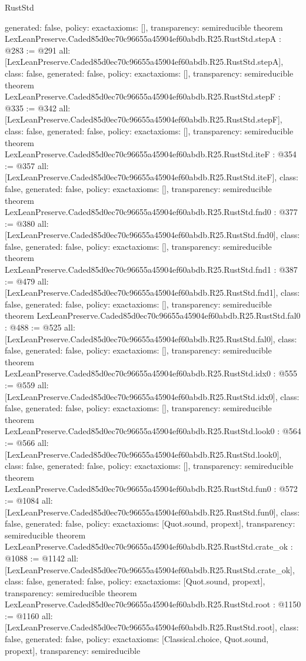 \begin{lexlean}{RustStd}
\begin{coremodule}
{  generated: false,
  policy: exact{axioms: []},
  transparency: semireducible
}
theorem LexLeanPreserve.Caded85d0ec70c96655a45904ef60abdb.R25.RustStd.stepA : @283 := @291 {
  all: [LexLeanPreserve.Caded85d0ec70c96655a45904ef60abdb.R25.RustStd.stepA],
  class: false,
  generated: false,
  policy: exact{axioms: []},
  transparency: semireducible
}
theorem LexLeanPreserve.Caded85d0ec70c96655a45904ef60abdb.R25.RustStd.stepF : @335 := @342 {
  all: [LexLeanPreserve.Caded85d0ec70c96655a45904ef60abdb.R25.RustStd.stepF],
  class: false,
  generated: false,
  policy: exact{axioms: []},
  transparency: semireducible
}
theorem LexLeanPreserve.Caded85d0ec70c96655a45904ef60abdb.R25.RustStd.iteF : @354 := @357 {
  all: [LexLeanPreserve.Caded85d0ec70c96655a45904ef60abdb.R25.RustStd.iteF],
  class: false,
  generated: false,
  policy: exact{axioms: []},
  transparency: semireducible
}
theorem LexLeanPreserve.Caded85d0ec70c96655a45904ef60abdb.R25.RustStd.fnd0 : @377 := @380 {
  all: [LexLeanPreserve.Caded85d0ec70c96655a45904ef60abdb.R25.RustStd.fnd0],
  class: false,
  generated: false,
  policy: exact{axioms: []},
  transparency: semireducible
}
theorem LexLeanPreserve.Caded85d0ec70c96655a45904ef60abdb.R25.RustStd.fnd1 : @387 := @479 {
  all: [LexLeanPreserve.Caded85d0ec70c96655a45904ef60abdb.R25.RustStd.fnd1],
  class: false,
  generated: false,
  policy: exact{axioms: []},
  transparency: semireducible
}
theorem LexLeanPreserve.Caded85d0ec70c96655a45904ef60abdb.R25.RustStd.fal0 : @488 := @525 {
  all: [LexLeanPreserve.Caded85d0ec70c96655a45904ef60abdb.R25.RustStd.fal0],
  class: false,
  generated: false,
  policy: exact{axioms: []},
  transparency: semireducible
}
theorem LexLeanPreserve.Caded85d0ec70c96655a45904ef60abdb.R25.RustStd.idx0 : @555 := @559 {
  all: [LexLeanPreserve.Caded85d0ec70c96655a45904ef60abdb.R25.RustStd.idx0],
  class: false,
  generated: false,
  policy: exact{axioms: []},
  transparency: semireducible
}
theorem LexLeanPreserve.Caded85d0ec70c96655a45904ef60abdb.R25.RustStd.look0 : @564 := @566 {
  all: [LexLeanPreserve.Caded85d0ec70c96655a45904ef60abdb.R25.RustStd.look0],
  class: false,
  generated: false,
  policy: exact{axioms: []},
  transparency: semireducible
}
theorem LexLeanPreserve.Caded85d0ec70c96655a45904ef60abdb.R25.RustStd.fun0 : @572 := @1084 {
  all: [LexLeanPreserve.Caded85d0ec70c96655a45904ef60abdb.R25.RustStd.fun0],
  class: false,
  generated: false,
  policy: exact{axioms: [Quot.sound, propext]},
  transparency: semireducible
}
theorem LexLeanPreserve.Caded85d0ec70c96655a45904ef60abdb.R25.RustStd.crate_ok : @1088 := @1142 {
  all: [LexLeanPreserve.Caded85d0ec70c96655a45904ef60abdb.R25.RustStd.crate_ok],
  class: false,
  generated: false,
  policy: exact{axioms: [Quot.sound, propext]},
  transparency: semireducible
}
theorem LexLeanPreserve.Caded85d0ec70c96655a45904ef60abdb.R25.RustStd.root : @1150 := @1160 {
  all: [LexLeanPreserve.Caded85d0ec70c96655a45904ef60abdb.R25.RustStd.root],
  class: false,
  generated: false,
  policy: exact{axioms: [Classical.choice, Quot.sound, propext]},
  transparency: semireducible
}


\end{coremodule}
\end{lexlean}
